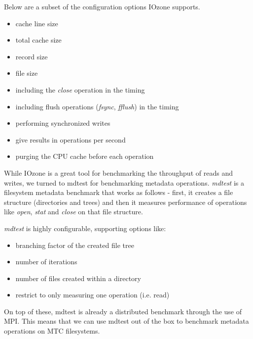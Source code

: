 Below are a subset of the configuration options IOzone supports.

\begin{itemize}

\item cache line size
\item total cache size
\item record size
\item file size
\item including the \textit{close} operation in the timing
\item including flush operations (\textit{fsync}, \textit{fflush}) in the timing
\item performing synchronized writes
\item give results in operations per second
\item purging the CPU cache before each operation

\end{itemize}

While IOzone is a great tool for benchmarking the throughput of reads and writes, we turned to mdtest for benchmarking metadata operations. \textit{mdtest}\cite{mdtest} is a filesystem metadata benchmark that works as follows - first, it creates a file structure (directories and trees) and then it measures performance of operations like \textit{open}, \textit{stat} and \textit{close} on that file structure.

\textit{mdtest} is highly configurable, supporting options like:

\begin{itemize}

\item branching factor of the created file tree
\item number of iterations
\item number of files created within a directory
\item restrict to only measuring one operation (i.e. read)

\end{itemize}

On top of these, mdtest is already a distributed benchmark through the use of MPI. This means that we can use mdtest out of the box to benchmark metadata operations on MTC filesystems.
